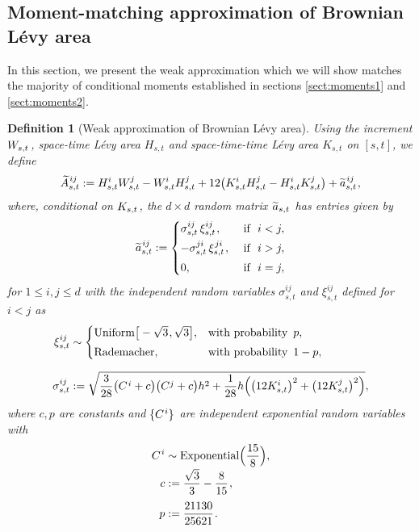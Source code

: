 \documentclass[sn-mathphys-num]{sn-jnl}%
\newtheorem{definition}{Definition}%
\newcommand{\m}{\hspace{0.25mm}}
\begin{document}
\subsection{Moment-matching approximation of Brownian L\'{e}vy area}

In this section, we present the weak approximation \cite[Definition 7.3.5]{foster2020thesis} which we will show matches the majority of conditional moments established in sections \ref{sect:moments1} and \ref{sect:moments2}.\medbreak

\begin{definition}[Weak approximation of Brownian L\'{e}vy area]\label{def:weak_levy_area}
Using the increment $W_{s,t}\m$, space-time L\'{e}vy area $H_{s,t}$ and space-time-time L\'{e}vy area $K_{s,t}$ on $[s,t]$, we define
\begin{align}\label{eq:weak_levy_area}
\widetilde{A}_{s,t}^{\m ij} := H_{s,t}^i W_{s,t}^j - W_{s,t}^i H_{s,t}^j + 12\big(K_{s,t}^i H_{s,t}^j - H_{s,t}^i K_{s,t}^j\big) + \widetilde{a}_{s,t}^{\m ij}\m,
\end{align}
where, conditional on $K_{s,t}\m$, the $d\times d$ random matrix $\m\widetilde{a}_{s,t}\m$ has entries given by
\begin{align*}
\widetilde{a}_{s,t}^{\m ij} := \begin{cases}\sigma_{s,t}^{ij}\, \xi_{s,t}^{ij}\m, & \text{ if }\,\, i < j,\\[3pt]
-\sigma_{s,t}^{ji}\, \xi_{s,t}^{\m ji}\m, & \text{ if }\,\, i > j,\\[3pt]
0, & \text{ if }\,\,i = j,
\end{cases}
\end{align*}
for $1\leq i,j\leq d$ with the independent random variables $\sigma_{s,t}^{ij}$ and $\xi_{s,t}^{ij}$ defined for $i < j$ as
\begin{align*}
\xi_{s,t}^{ij} &\sim \begin{cases} \mathrm{Uniform}\big[-\sqrt{3}\m, \sqrt{3}\big], & \text{with probability }\,p,\\[3pt] \mathrm{Rademacher}, & \text{with probability }\,1 - p,\end{cases}\\[6pt]
\sigma_{s,t}^{ij} & := \sqrt{\frac{3}{28}\big(C^{\m i} + c\big)\big(C^j + c\big)h^2 + \frac{1}{28}h\Big(\big(12 K_{s,t}^i\big)^2 + \big(12 K_{s,t}^j\big)^2\Big)},
\end{align*}
where $c, p$ are constants and $\{C^{\m i}\}$ are independent exponential random variables with
\begin{align*}
C^{\m i} & \sim \mathrm{Exponential}\Big(\frac{15}{8}\Big),\\[-2pt]
c & := \frac{\sqrt{3}}{3} - \frac{8}{15}\m,\\[3pt]
p & := \frac{21130}{25621}\m.
\end{align*}
\end{definition}
\end{document}
